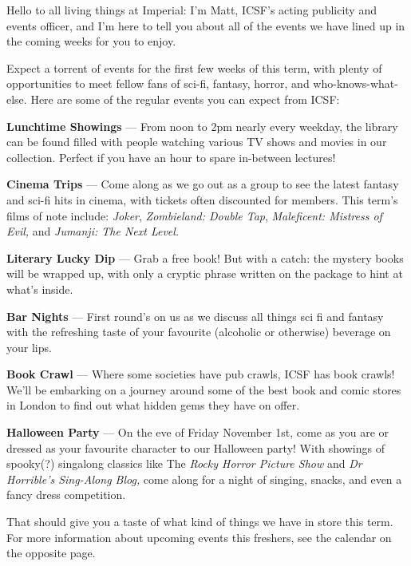 Hello to all living things at Imperial: I’m Matt, ICSF’s acting
publicity and events officer, and I’m here to tell you about all of
the events we have lined up in the coming weeks for you to enjoy.

Expect a torrent of events for the first few weeks of this term, with
plenty of opportunities to meet fellow fans of sci-fi, fantasy,
horror, and who-knows-what-else.  Here are some of the regular events
you can expect from ICSF:

\textbf{Lunchtime Showings} ---
From noon to 2pm nearly every weekday, the library can be found filled
with people watching various TV shows and movies in our
collection. Perfect if you have an hour to spare in-between lectures!

\textbf{Cinema Trips} ---
Come along as we go out as a group to see the latest fantasy and
sci-fi hits in cinema, with tickets often discounted for members. This
term’s films of note include: \textit{Joker}, \textit{Zombieland:
Double Tap}, \textit{Maleficent: Mistress of Evil,}
and \textit{Jumanji: The Next Level.}

\textbf{Literary Lucky Dip} ---
Grab a free book! But with a catch: the mystery books will be wrapped
up, with only a cryptic phrase written on the package to hint at
what’s inside.

\textbf{Bar Nights} ---
First round’s on us as we discuss all things sci fi and fantasy with
the refreshing taste of your favourite (alcoholic or otherwise)
beverage on your lips.

\textbf{Book Crawl} ---
Where some societies have pub crawls, ICSF has book crawls! We’ll be
embarking on a journey around some of the best book and comic stores
in London to find out what hidden gems they have on offer.

\textbf{Halloween Party} ---
On the eve of Friday November 1st, come as you are or dressed as your
favourite character to our Halloween party!  With showings of
spooky(?) singalong classics like The \textit{Rocky Horror Picture
Show} and \textit{Dr Horrible’s Sing-Along Blog,} come along for a
night of singing, snacks, and even a fancy dress competition.

That should give you a taste of what kind of things we have in store
this term. For more information about upcoming events this freshers,
see the calendar on the opposite page.
